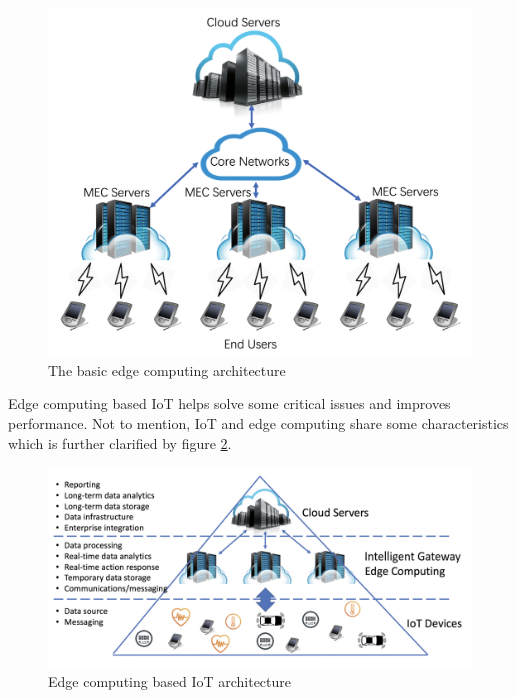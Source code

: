 \begin{figure}
    \begin{center}
        \includegraphics[scale=0.35]{Figs/edge_arch.png}    
    \end{center}
    \caption{The basic edge computing architecture}
    \label{fig:edgearch}
\end{figure}

Edge computing based IoT helps solve some critical issues and improves performance. Not to mention, IoT and 
edge computing share some characteristics which is further clarified by figure \ref{fig:edgeiot}. 
\begin{figure}
    \begin{center}
        \includegraphics[scale=0.35]{Figs/edge_iot.png}    
    \end{center}
    \caption{Edge computing based IoT architecture}
    \label{fig:edgeiot}
\end{figure}

